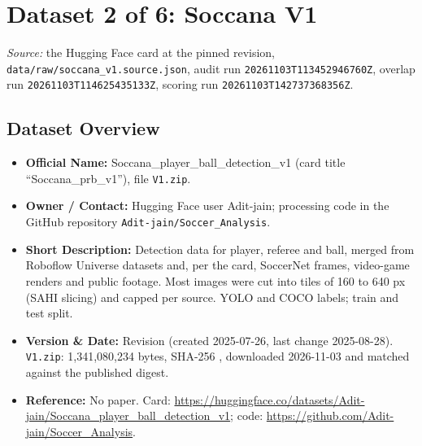 \documentclass[11pt, a4paper]{article}
\newif\ifreportednoted
\newcommand{\resetreported}{\global\reportednotedfalse}
\begin{document}
\section{Dataset 2 of 6: Soccana V1}
\resetreported

\begin{sloppypar}\noindent\textit{Source:} the Hugging Face card at the pinned revision, \texttt{data/raw/}\allowbreak\texttt{soccana\_v1.source.json}, audit run \texttt{20261103T113452946760Z}, overlap run \texttt{20261103T114625435133Z}, scoring run \texttt{20261103T142737368356Z}.\end{sloppypar}

\subsection{Dataset Overview}
\begin{itemize}
    \item \textbf{Official Name:} Soccana\_player\_ball\_detection\_v1 (card title ``Soccana\_prb\_v1''), file \texttt{V1.zip}.
    \item \textbf{Owner / Contact:} Hugging Face user Adit-jain; processing code in the GitHub repository \texttt{Adit-jain/Soccer\_Analysis}.
    \item \textbf{Short Description:} Detection data for player, referee and ball, merged from Roboflow Universe datasets and, per the card, SoccerNet frames, video-game renders and public footage. Most images were cut into tiles of 160 to 640 px (SAHI slicing) and capped per source. YOLO and COCO labels; train and test split.
    \item \textbf{Version \& Date:} Revision  (created 2025-07-26, last change 2025-08-28). \texttt{V1.zip}: 1,341,080,234 bytes, SHA-256 , downloaded 2026-11-03 and matched against the published digest.
    \item \textbf{Reference:} No paper. Card: \url{https://huggingface.co/datasets/Adit-jain/Soccana_player_ball_detection_v1}; code: \url{https://github.com/Adit-jain/Soccer_Analysis}.
\end{itemize}
\end{document}
